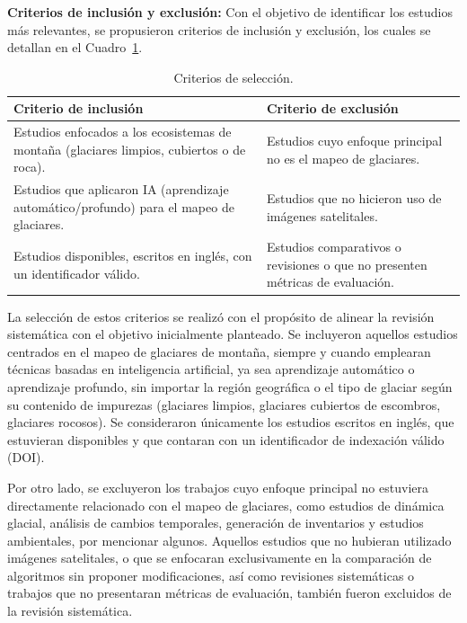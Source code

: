 \textbf{Criterios de inclusión y exclusión:} Con el objetivo de identificar los estudios más relevantes, se propusieron criterios de inclusión y exclusión, los cuales se detallan en el Cuadro~\ref{tab:CriteriosSeleccion}.

\begin{table}[H]
\small
\caption{Criterios de selección.\label{tab:CriteriosSeleccion}}
\begin{tabularx}{\textwidth}{XX}
\hline
\textbf{Criterio de inclusión} & \textbf{Criterio de exclusión}\\
\hline
Estudios enfocados a los ecosistemas de montaña (glaciares limpios, cubiertos o de roca). & Estudios cuyo enfoque principal no es el mapeo de glaciares.\\\hline
Estudios que aplicaron IA (aprendizaje automático/profundo) para el mapeo de glaciares. & Estudios que no hicieron uso de imágenes satelitales.\\\hline
Estudios disponibles, escritos en inglés, con un identificador válido. & Estudios comparativos o revisiones o que no presenten métricas de evaluación. \\
\hline
\end{tabularx}
\end{table}

La selección de estos criterios se realizó con el propósito de alinear la revisión sistemática con el objetivo inicialmente planteado. Se incluyeron aquellos estudios centrados en el mapeo de glaciares de montaña, siempre y cuando emplearan técnicas basadas en inteligencia artificial, ya sea aprendizaje automático o aprendizaje profundo, sin importar la región geográfica o el tipo de glaciar según su contenido de impurezas (glaciares limpios, glaciares cubiertos de escombros, glaciares rocosos). Se consideraron únicamente los estudios escritos en inglés, que estuvieran disponibles y que contaran con un identificador de indexación válido (DOI).

Por otro lado, se excluyeron los trabajos cuyo enfoque principal no estuviera directamente relacionado con el mapeo de glaciares, como estudios de dinámica glacial, análisis de cambios temporales, generación de inventarios y estudios ambientales, por mencionar algunos. Aquellos estudios que no hubieran utilizado imágenes satelitales, o que se enfocaran exclusivamente en la comparación de algoritmos sin proponer modificaciones, así como revisiones sistemáticas o trabajos que no presentaran métricas de evaluación, también fueron excluidos de la revisión sistemática.

